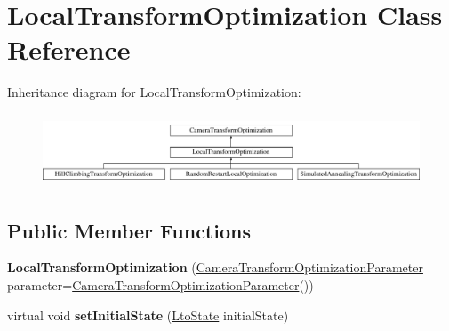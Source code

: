 \hypertarget{classLocalTransformOptimization}{\section{\-Local\-Transform\-Optimization \-Class \-Reference}
\label{classLocalTransformOptimization}
}
\-Inheritance diagram for \-Local\-Transform\-Optimization\-:\begin{figure}[H]
\begin{center}
\leavevmode
\includegraphics[height=2.187500cm]{classLocalTransformOptimization}
\end{center}
\end{figure}
\subsection*{\-Public \-Member \-Functions}
\begin{DoxyCompactItemize}
\item 
\hypertarget{classLocalTransformOptimization_ab4017ab5dead7c68ae6bacd9aeceeb59}{{\bfseries \-Local\-Transform\-Optimization} (\hyperlink{classCameraTransformOptimizationParameter}{\-Camera\-Transform\-Optimization\-Parameter} parameter=\hyperlink{classCameraTransformOptimizationParameter}{\-Camera\-Transform\-Optimization\-Parameter}())}\label{classLocalTransformOptimization_ab4017ab5dead7c68ae6bacd9aeceeb59}

\item 
\hypertarget{classLocalTransformOptimization_a86d6149a04bb57a901a3ce2ffe545eea}{virtual void {\bfseries set\-Initial\-State} (\hyperlink{classLtoState}{\-Lto\-State} initial\-State)}\label{classLocalTransformOptimization_a86d6149a04bb57a901a3ce2ffe545eea}

\end{DoxyCompactItemize}
